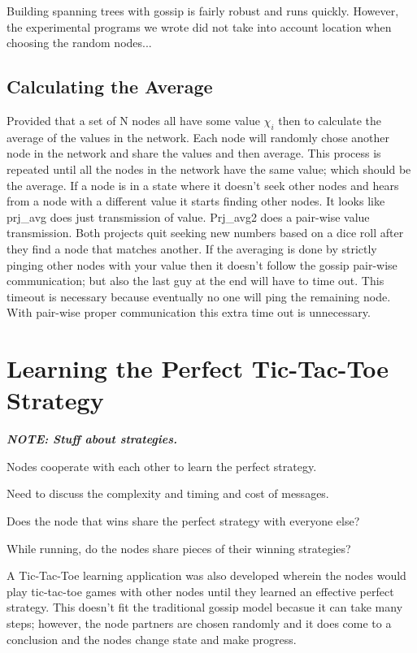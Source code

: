 \documentclass[11pt,twocolumn]{article}
\begin{document}
Building spanning trees with gossip is fairly robust and runs quickly.  However, the experimental programs we wrote did not take into account location when choosing the random nodes...

\subsection{Calculating the Average}

Provided that a set of N nodes all have some value $\chi_i$ then to calculate the average of the values in the network.  Each node will randomly chose another node in the network and share the values and then average.  This process is repeated until all the nodes in the network have the same value; which should be the average.  If a node is in a state where it doesn't seek other nodes and hears from a node with a different value it starts finding other nodes.  It looks like prj\_avg does just transmission of value.  Prj\_avg2 does a pair-wise value transmission.  Both projects quit seeking new numbers based on a dice roll after they find a node that matches another.  If the averaging is done by strictly pinging other nodes with your value then it doesn't follow the gossip pair-wise communication; but also the last guy at the end will have to time out.  This timeout is necessary because eventually no one will ping the remaining node.  With pair-wise proper communication this extra time out is unnecessary.

\section{Learning the Perfect Tic-Tac-Toe Strategy}

{\bf {\em NOTE: Stuff about strategies.}}

Nodes cooperate with each other to learn the perfect strategy.

Need to discuss the complexity and timing and cost of messages.

Does the node that wins share the perfect strategy with everyone else?

While running, do the nodes share pieces of their winning strategies?

A Tic-Tac-Toe learning application was also developed wherein the nodes would play tic-tac-toe games with other nodes until they learned an effective perfect strategy.  This doesn't fit the traditional gossip model becasue it can take many steps; however, the node partners are chosen randomly and it does come to a conclusion and the nodes change state and make progress.
\end{document}
